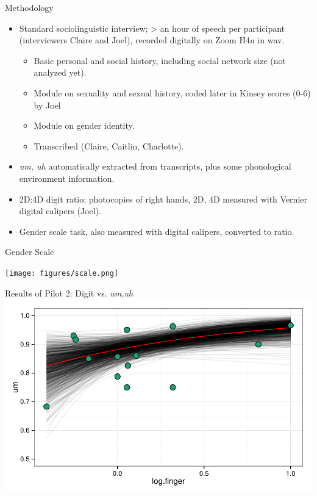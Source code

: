\documentclass[hyperref={pdfpagelabels=false}]{beamer}
\begin{document}
\begin{frame}{Methodology}
\begin{itemize}
	\item Standard sociolinguistic interview; > an hour of speech per participant (interviewers Claire and Joel), recorded digitally on Zoom H4n in wav.
		\begin{itemize}
			\item Basic personal and social history, including social network size (not analyzed yet).
			\item Module on sexuality and sexual history, coded later in Kinsey scores (0-6) by Joel
			\item Module on gender identity.
			\item Transcribed (Claire, Caitlin, Charlotte).
		\end{itemize}
	\item \textsl{um, uh} automatically extracted from transcripts, plus some phonological environment information.
	\item 2D:4D digit ratio: photocopies of right hands, 2D, 4D measured with Vernier digital calipers (Joel).
	\item Gender scale task, also measured with digital calipers, converted to ratio.
\end{itemize}
\end{frame}

\begin{frame}{Gender Scale}
\begin{center}
	\texttt{[image: figures/scale.png]}
\end{center}
\end{frame}


\begin{frame}{Results of Pilot 2: Digit vs. \textsl{um,uh}}
\includegraphics[width=1.12\textwidth]{figures/fingereffect.pdf}
\end{frame}
\end{document}
